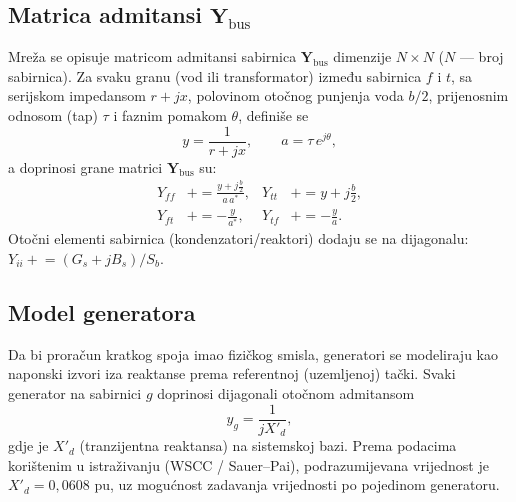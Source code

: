 \documentclass[12pt,a4paper]{article}
\begin{document}
\subsection{Matrica admitansi $\mathbf{Y}_{\text{bus}}$}
Mreža se opisuje matricom admitansi sabirnica $\mathbf{Y}_{\text{bus}}$
dimenzije $N\times N$ ($N$ --- broj sabirnica). Za svaku granu (vod ili
transformator) između sabirnica $f$ i $t$, sa serijskom impedansom $r+jx$,
polovinom otočnog punjenja voda $b/2$, prijenosnim odnosom (tap) $\tau$ i faznim
pomakom $\theta$, definiše se
\begin{equation}
y = \frac{1}{r+jx}, \qquad a = \tau\,e^{j\theta},
\end{equation}
a doprinosi grane matrici $\mathbf{Y}_{\text{bus}}$ su:
\begin{align}
Y_{ff} &\mathrel{+}= \frac{y + j\tfrac{b}{2}}{a\,a^{*}}, &
Y_{tt} &\mathrel{+}= y + j\tfrac{b}{2},\\
Y_{ft} &\mathrel{+}= -\frac{y}{a^{*}}, &
Y_{tf} &\mathrel{+}= -\frac{y}{a}.
\end{align}
Otočni elementi sabirnica (kondenzatori/reaktori) dodaju se na dijagonalu:
$Y_{ii}\mathrel{+}=(G_s+jB_s)/S_b$.

\subsection{Model generatora}
Da bi proračun kratkog spoja imao fizičkog smisla, generatori se modeliraju kao
naponski izvori iza reaktanse prema referentnoj (uzemljenoj) tački. Svaki
generator na sabirnici $g$ doprinosi dijagonali otočnom admitansom
\begin{equation}
y_g = \frac{1}{j X'_d},
\end{equation}
gdje je $X'_d$ (tranzijentna reaktansa) na sistemskoj bazi. Prema podacima
korištenim u istraživanju (WSCC / Sauer--Pai), podrazumijevana vrijednost je
$X'_d = 0{,}0608$ pu, uz mogućnost zadavanja vrijednosti po pojedinom generatoru.
\end{document}
